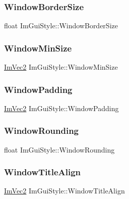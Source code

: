 \subsubsection{\texorpdfstring{Window\+Border\+Size}{WindowBorderSize}}
{\footnotesize\ttfamily float Im\+Gui\+Style\+::\+Window\+Border\+Size}

\hypertarget{struct_im_gui_style_a060b2f743a086d0f0fee4cd5b3f372d4}{}\label{struct_im_gui_style_a060b2f743a086d0f0fee4cd5b3f372d4} 
\subsubsection{\texorpdfstring{Window\+Min\+Size}{WindowMinSize}}
{\footnotesize\ttfamily \hyperlink{struct_im_vec2}{Im\+Vec2} Im\+Gui\+Style\+::\+Window\+Min\+Size}

\hypertarget{struct_im_gui_style_a37f156b53e6dcc99ff57366ceafe8b50}{}\label{struct_im_gui_style_a37f156b53e6dcc99ff57366ceafe8b50} 
\subsubsection{\texorpdfstring{Window\+Padding}{WindowPadding}}
{\footnotesize\ttfamily \hyperlink{struct_im_vec2}{Im\+Vec2} Im\+Gui\+Style\+::\+Window\+Padding}

\hypertarget{struct_im_gui_style_acd902c2ab4b53d4bb0f64da608320894}{}\label{struct_im_gui_style_acd902c2ab4b53d4bb0f64da608320894} 
\subsubsection{\texorpdfstring{Window\+Rounding}{WindowRounding}}
{\footnotesize\ttfamily float Im\+Gui\+Style\+::\+Window\+Rounding}

\hypertarget{struct_im_gui_style_a3fc57a15ab8f206045f1e5dfccd8b2e7}{}\label{struct_im_gui_style_a3fc57a15ab8f206045f1e5dfccd8b2e7} 
\subsubsection{\texorpdfstring{Window\+Title\+Align}{WindowTitleAlign}}
{\footnotesize\ttfamily \hyperlink{struct_im_vec2}{Im\+Vec2} Im\+Gui\+Style\+::\+Window\+Title\+Align}

